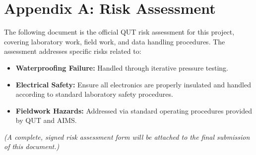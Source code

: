\chapter{Appendix A: Risk Assessment}

The following document is the official QUT risk assessment for this project, covering laboratory work, field work, and data handling procedures. The assessment addresses specific risks related to:
\begin{itemize}
    \item \textbf{Waterproofing Failure:} Handled through iterative pressure testing.
    \item \textbf{Electrical Safety:} Ensure all electronics are properly insulated and handled according to standard laboratory safety procedures.
    \item \textbf{Fieldwork Hazards:} Addressed via standard operating procedures provided by QUT and AIMS.
\end{itemize}

\textit{(A complete, signed risk assessment form will be attached to the final submission of this document.)}
